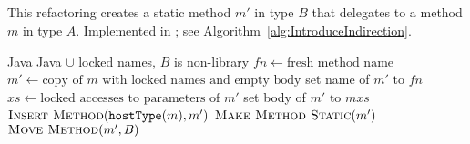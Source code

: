 \subsection{}
This refactoring creates a static method $m'$ in type $B$ that delegates to a method $m$ in type $A$. Implemented in ; see Algorithm~\ref{alg:IntroduceIndirection}.

\begin{algorithm}[p]
\caption{$\refactoring{Introduce Indirection}(m : \type{Method}, B : \type{ClassOrInterface})$}
\label{alg:IntroduceIndirection}
\begin{algorithmic}[1]
\REQUIRE Java
\ENSURE Java $\cup$ locked names, 
\medskip
\STATE \assert $B$ is non-library
\STATE $fn \leftarrow \text{fresh method name}$
\STATE $m' \leftarrow \text{copy of $m$ with locked names and empty body}$
\STATE set name of $m'$ to $fn$
\STATE $xs \leftarrow \text{locked accesses to parameters of $m'$}$
\STATE set body of $m'$ to \xspace$m$\code{(}$xs$\code{);}
\STATE $\textsc{Insert Method}(\text{\texttt{hostType}}(m), m')$
\STATE $\textsc{Make Method Static}(m')$
\STATE $\textsc{Move Method}(m', B)$ %
\end{algorithmic}
\end{algorithm}
